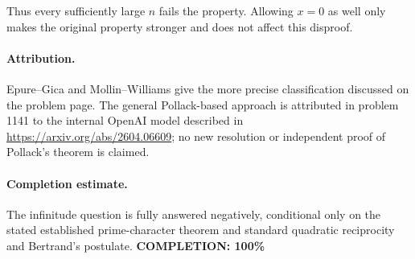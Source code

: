 Thus every sufficiently large \(n\) fails the property. Allowing \(x=0\) as well only makes the original property stronger and does not affect this disproof.

\paragraph{Attribution.}
Epure--Gica and Mollin--Williams give the more precise classification discussed on the problem page. The general Pollack-based approach is attributed in problem 1141 to the internal OpenAI model described in \url{https://arxiv.org/abs/2604.06609}; no new resolution or independent proof of Pollack's theorem is claimed.

\paragraph{Completion estimate.}
The infinitude question is fully answered negatively, conditional only on the stated established prime-character theorem and standard quadratic reciprocity and Bertrand's postulate.
\textbf{COMPLETION: 100\%}
